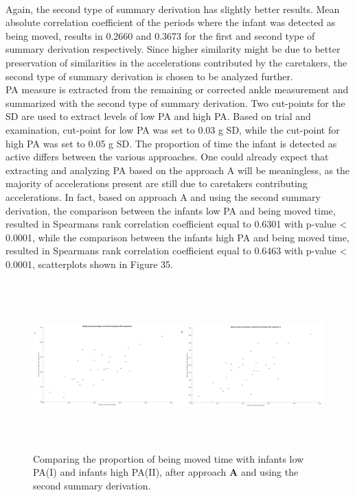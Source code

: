 \documentclass{article}
\begin{document}
{\\Again, the second type of summary derivation has slightly better results. Mean absolute correlation coefficient of the periods where the infant was detected as being moved, results in 0.2660 and 0.3673 for the first and second type of summary derivation respectively. Since higher similarity might be due to better preservation of similarities in the accelerations contributed by the caretakers, the second type of summary derivation is chosen to be analyzed further. 
\\PA measure is extracted from the remaining or corrected ankle measurement and summarized with the second type of summary derivation. Two cut-points for the SD are used to extract levels of low PA and high PA. Based on trial and examination, cut-point for low PA was set to 0.03 g SD, while the cut-point for high PA was set to 0.05 g SD.
The proportion of time the infant is detected as active differs between the various approaches. One could already expect that extracting and analyzing PA based on the approach A will be meaningless, as the majority of accelerations present are still due to caretakers contributing accelerations. In fact, based on approach A and using the second summary derivation, the comparison between the infants low PA and being moved time, resulted in Spearmans rank correlation coefficient equal to 0.6301 with p-value < 0.0001, while the comparison between the infants high PA and being moved time, resulted in Spearmans rank correlation coefficient equal to 0.6463 with p-value < 0.0001, scatterplots shown in Figure 35.
\begin{figure}[h]
\includegraphics[width=15cm, height=6.5cm]{IBM_vs_PA_A.png}
\caption{Comparing the proportion of being moved time with infants low PA(I) and infants high PA(II), after approach \textbf{A} and using the second summary derivation.}
\end{figure}
\newpage
}
\end{document}
